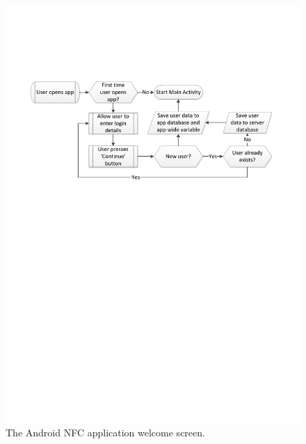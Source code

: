 \begin{figure}
 \centering 
 \includegraphics[clip = true, trim = 30 490 0 150,
 scale=0.75]{welcome_screen_processflow}
 \caption{The Android NFC application welcome screen.}
 \label{fig:app-welcomescreen}
\end{figure}

